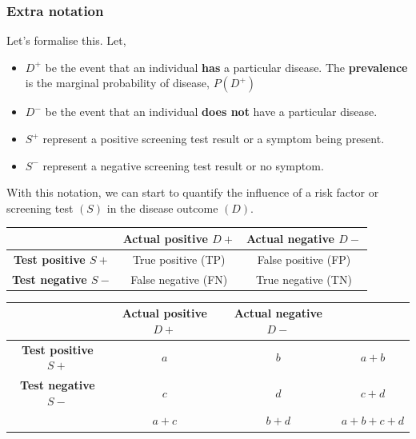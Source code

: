 \documentclass[a4paper]{article}\usepackage[]{graphicx}\usepackage[]{xcolor}
\begin{document}
\subsubsection{Extra notation}
Let's formalise this. Let,
\begin{itemize}
	\item \textcolor{mygreen}{\( D^+ \)} be the event that an individual \textbf{has} a particular disease. The \textbf{prevalence} is the marginal probability of disease, \( P(D^+) \)
	\item \textcolor{mygreen}{\( D^- \)} be the event that an individual \textbf{does not} have a particular disease.
	\item \textcolor{myred}{\( S^+ \)} represent a positive screening test result or a symptom being present.
	\item \textcolor{myred}{\( S^- \)} represent a negative screening test result or no symptom.
\end{itemize}
With this notation, we can start to quantify the influence of a risk factor or screening test \( (S) \) in the disease outcome \( (D) \).
\begin{table}[H]
	\centering
	\begin{tabular}{@{}c|cc@{}}
	\toprule
	                                & \textcolor{mygreen}{\textbf{Actual positive \( D+ \)}} & \textcolor{mygreen}{\textbf{Actual negative \( D- \)}} \\ \midrule
	\textcolor{myred}{\textbf{Test positive \( S+ \)}}  & True positive (TP)       & False positive (FP)      \\
	\textcolor{myred}{\textbf{Test negative \( S- \)}} & False negative (FN)      & True negative (TN)       \\ \bottomrule
	\end{tabular}
\end{table}
\begin{table}[H]
	\centering
	\begin{tabular}{@{}cccc@{}}
	\toprule
	& \textcolor{mygreen}{\textbf{Actual positive \( D+ \)}} & \textcolor{mygreen}{\textbf{Actual negative \( D- \)}} \\ \midrule
	\textcolor{myred}{\textbf{Test positive \( S+ \)}}  & \( a \)   & \( b \)   & \( a + b \) \\
	\textcolor{myred}{\textbf{Test negative \( S- \)}} & \( c \)   & \( d \)   & \( c + d \) \\
													   & \( a+c \) & \( b+d \) & \( a + b + c + d \) \\ \bottomrule
	\end{tabular}
\end{table}
\end{document}
